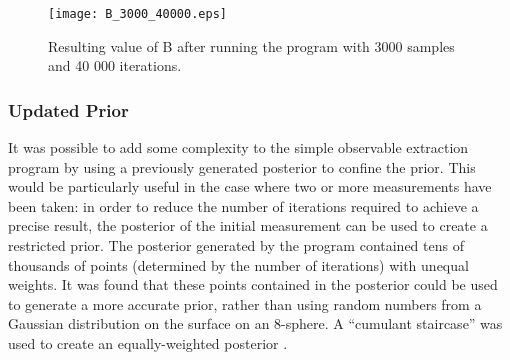 \documentclass[a4paper,12pt]{article}
\begin{document}

\begin{figure}[!h]
 \begin{center}
  \texttt{[image: B\_3000\_40000.eps]}
  \caption{Resulting value of B after running the program with 3000 samples and 40 000 iterations.}
 \end{center}
\end{figure}


\subsubsection{Updated Prior}
It was possible to add some complexity to the simple observable extraction program by using a previously generated posterior to confine the prior.  This would be particularly useful in the case where two or more measurements have been taken: in order to reduce the number of iterations required to achieve a precise result, the posterior of the initial measurement can be used to create a restricted prior.  The posterior generated by the program contained tens of thousands of points (determined by the number of iterations) with unequal weights.  It was found that these points contained in the posterior could be used to generate a more accurate prior, rather than using random numbers from a Gaussian distribution on the surface on an 8-sphere.  A ``cumulant staircase'' was used to create an equally-weighted posterior \cite{sivia}.
\end{document}
